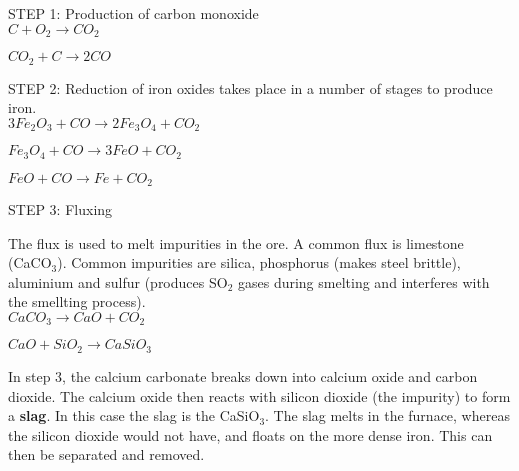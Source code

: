 \begin{center}

STEP 1: Production of carbon monoxide\\

\rm${C + O_{2} \rightarrow CO_{2}}$

\rm${CO_{2} + C \rightarrow 2CO}$
\end{center}

\begin{center}
STEP 2: Reduction of iron oxides takes place in a number of stages to produce iron.\\

\rm${3Fe_{2}O_{3} + CO \rightarrow 2Fe_{3}O_{4} + CO_{2}}$

\rm${Fe_{3}O_{4} + CO \rightarrow 3FeO + CO_{2}}$

\rm${FeO + CO \rightarrow Fe + CO_{2}}$
\end{center}

\begin{center}
STEP 3: Fluxing

The flux is used to melt impurities in the ore. A common flux is limestone (CaCO$_{3}$). Common impurities are silica, phosphorus (makes steel brittle), aluminium and sulfur (produces SO$_{2}$ gases during smelting and interferes with the smellting process).\\


\rm${CaCO_{3} \rightarrow CaO + CO_{2}}$

\rm${CaO + SiO_{2} \rightarrow CaSiO_{3}}$
\end{center}

In step 3, the calcium carbonate breaks down into calcium oxide and carbon dioxide. The calcium oxide then reacts with silicon dioxide (the impurity) to form a \textbf{slag}. In this case the slag is the CaSiO$_{3}$. The slag melts in the furnace, whereas the silicon dioxide would not have, and floats on the more dense iron. This can then be separated and removed.

